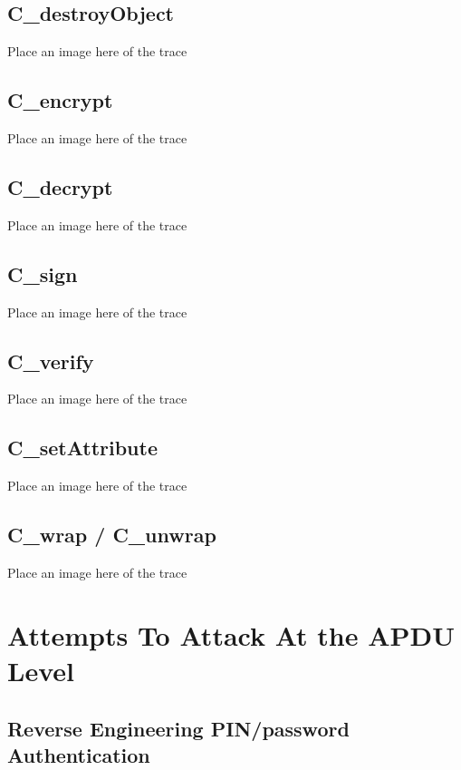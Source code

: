 \documentclass[bsc,frontabs,twoside,singlespacing,parskip,deptreport]{infthesis}     %
\begin{document}
\section{C\_destroyObject}
Place an image here of the trace
\section{C\_encrypt}
Place an image here of the trace
\section{C\_decrypt}
Place an image here of the trace
\section{C\_sign}
Place an image here of the trace
\section{C\_verify}
Place an image here of the trace
\section{C\_setAttribute}
Place an image here of the trace
\section{C\_wrap / C\_unwrap}
Place an image here of the trace




\chapter{Attempts To Attack At the APDU Level}


\section{Reverse Engineering PIN/password Authentication}
\end{document}
